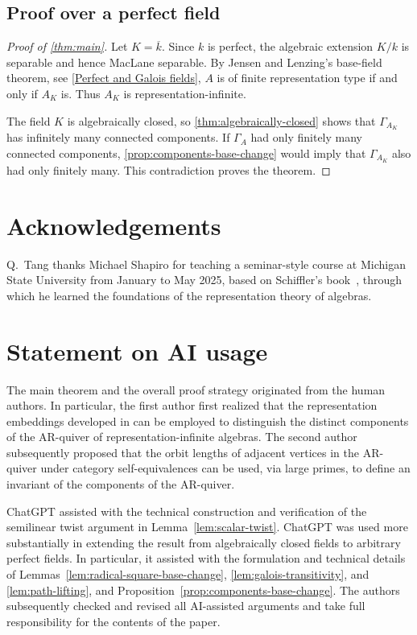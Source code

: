 \documentclass[11pt,letterpaper,reqno]{amsart}
\theoremstyle{definition}
\newcommand{\kkbar}{\overline{k}}
\begin{document}
\subsection{Proof over a perfect field}

\begin{proof}[Proof of \cref{thm:main}]
Let $K=\kkbar$.  Since $k$ is perfect, the algebraic extension $K/k$ is
separable and hence MacLane separable.  By Jensen and Lenzing's base-field
theorem, see \cref{Perfect and Galois fields}, $A$ is of finite representation
type if and only if $A_K$ is.  Thus $A_K$ is representation-infinite.

The field $K$ is algebraically closed, so
\cref{thm:algebraically-closed} shows that $\Gamma_{A_K}$ has infinitely
many connected components.  If $\Gamma_A$ had only finitely many connected
components, \cref{prop:components-base-change} would imply that
$\Gamma_{A_K}$ also had only finitely many.  This contradiction proves the
theorem.
\end{proof}

\section*{Acknowledgements}

Q.~Tang thanks Michael Shapiro for teaching a seminar-style course at
Michigan State University from January to May 2025, based on Schiffler's
book~\cite{Schiffler}, through which he learned the foundations of the
representation theory of algebras.


\section*{Statement on AI usage}

The main theorem and the overall proof strategy originated from the human authors.  In particular, the first author first realized that the representation embeddings developed in \cite{Bongartz,BPS} can be employed to distinguish the distinct components of the AR-quiver of representation-infinite algebras. The second author subsequently proposed that the orbit lengths of adjacent vertices in the AR-quiver under category self-equivalences can be used, via large primes, to define an invariant of the components of the AR-quiver. 

ChatGPT assisted
with the technical construction and verification of the semilinear
twist argument in Lemma~\ref{lem:scalar-twist}.
ChatGPT was used more substantially in extending the result from
algebraically closed fields to arbitrary perfect fields.  In
particular, it assisted with the formulation and technical details of
Lemmas~\ref{lem:radical-square-base-change},
\ref{lem:galois-transitivity}, and \ref{lem:path-lifting}, and
Proposition~\ref{prop:components-base-change}.  The authors subsequently
checked and revised all AI-assisted arguments and take full
responsibility for the contents of the paper.
\end{document}
